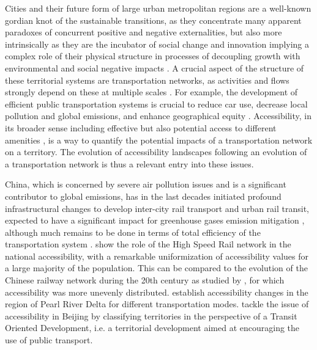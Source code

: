 Cities and their future form of large urban metropolitan regions are a well-known gordian knot of the sustainable transitions, as they concentrate many apparent paradoxes of concurrent positive and negative externalities, but also more intrinsically as they are the incubator of social change and innovation \citep{pumain2009innovation} implying a complex role of their physical structure in processes of decoupling growth with environmental and social negative impacts \citep{bergeaud2018bel}. A crucial aspect of the structure of these territorial systems are transportation networks, as activities and flows strongly depend on these at multiple scales \citep{raimbault2018caracterisation}. For example, the development of efficient public transportation systems is crucial to reduce car use, decrease local pollution and global emissions, and enhance geographical equity \citep{sinha2003sustainability}. Accessibility, in its broader sense including effective but also potential access to different amenities \citep{bavoux2005geographie}, is a way to quantify the potential impacts of a transportation network on a territory. The evolution of accessibility landscapes following an evolution of a transportation network is thus a relevant entry into these issues.

China, which is concerned by severe air pollution issues and is a significant contributor to global emissions, has in the last decades initiated profound infrastructural changes to develop inter-city rail transport and urban rail transit, expected to have a significant impact for greenhouse gases emission mitigation \citep{han2008system}, although much remains to be done in terms of total efficiency of the transportation system \citep{chang2013environmental}. \cite{jiao2014impacts} show the role of the High Speed Rail network in the national accessibility, with a remarkable uniformization of accessibility values for a large majority of the population. This can be compared to the evolution of the Chinese railway network during the 20th century as studied by \cite{wang2009spatiotemporal}, for which accessibility was more unevenly distributed. \cite{hou2011transport} establish accessibility changes in the region of Pearl River Delta for different transportation modes. \cite{lyu2016developing} tackle the issue of accessibility in Beijing by classifying territories in the perspective of a Transit Oriented Development, i.e. a territorial development aimed at encouraging the use of public transport.


